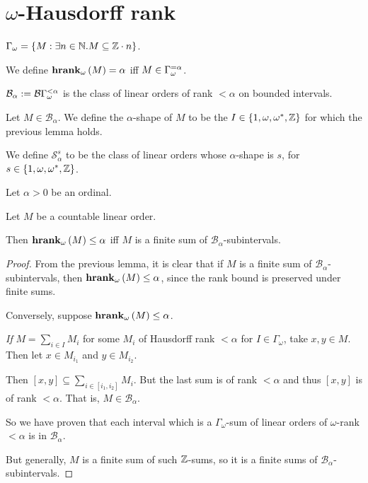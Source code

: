 \section{\texorpdfstring{$\omega$}{omega}-Hausdorff rank}

\begin{definitions}
  $\Gamma_{\omega} = \left\{ {M : \exists n \in \mathbb{N} . M \subseteq \mathbb{Z} \cdot n} \right\}$.

  We define $\mathbf{hrank}_{\omega}\left( M \right) = \alpha$ iff $M \in \Gamma_{\omega}^{= \alpha}$.

  $\mathcal{B}_{\alpha} := \mathcal{B}{\Gamma_{\omega}^{< \alpha}}$ is the class
  of linear orders of rank $< \alpha$ on bounded intervals.
\end{definitions}


\begin{definition}
  Let $M \in \mathcal{B}_{\alpha}$. We define the $\alpha$-shape
  of $M$ to be the $I \in \left\{ {1, \omega, \omega^\ast, \mathbb{Z}} \right\}$ 
  for which the previous lemma holds.

  We define $\mathcal{S}^{s}_{\alpha}$ to be the class of linear orders
  whose $\alpha$-shape is $s$, for $s \in \left\{ {1, \omega, \omega^\ast, \mathbb{Z}} \right\}$.
\end{definition}

\begin{lemma}
  Let $\alpha > 0$ be an ordinal.

  Let $M$ be a countable linear order.

  Then $\mathbf{hrank}_{\omega}\left( M \right) \le \alpha$ iff $M$ is a finite sum of $\mathcal{B}_{\alpha}$-subintervals.
\end{lemma}

\begin{proof}
  From the previous lemma, it is clear that if $M$ is a finite sum of $\mathcal{B}_{\alpha}$-subintervals,
  then $\mathbf{hrank}_{\omega}\left( M \right) \le \alpha$, since the rank bound is preserved under finite sums.

  Conversely, suppose $\mathbf{hrank}_{\omega}\left( M \right) \le \alpha$.

  \emph{If} $M = \sum_{i \in I} M_i$ for some $M_i$ of Hausdorff rank $< \alpha$ for $I \in \Gamma_{\omega}$,
  take $x, y \in M$. Then let $x \in M_{i_1}$ and $y \in M_{i_2}$.

  Then $[x, y] \subseteq \sum_{i \in [i_1, i_2]} M_i$. But the last sum is of rank $< \alpha$
  and thus $[x, y]$ is of rank $< \alpha$. That is, $M \in \mathcal{B}_{\alpha}$.

  So we have proven that each interval which is a $\Gamma_{\omega}$-sum of linear orders of
  $\omega$-rank $< \alpha$ is in $\mathcal{B}_{\alpha}$.

  But generally, $M$ is a finite sum of such $\mathbb{Z}$-sums, so it is a finite sums
  of $\mathcal{B}_{\alpha}$-subintervals.
\end{proof}


